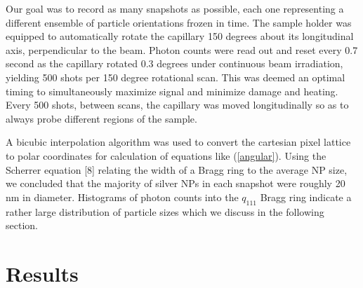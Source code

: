 \documentclass [11pt,fleqn]{article}
\begin{document}
Our goal was to record as many snapshots as possible, each one representing a different ensemble of particle orientations frozen in time. The sample holder was equipped to automatically rotate the capillary 150 degrees about its longitudinal axis, perpendicular to the beam. Photon counts were read out and reset every 0.7 second as the capillary rotated 0.3 degrees under continuous beam irradiation, yielding 500 shots per 150 degree rotational scan. This was deemed an optimal timing to simultaneously maximize signal and minimize damage and heating. Every 500 shots, between scans, the capillary was moved longitudinally so as to always probe different regions of the sample.

A bicubic interpolation algorithm was used to convert the cartesian pixel lattice to polar coordinates for calculation of equations like (\ref{angular}). Using the Scherrer equation [8] relating the width of a Bragg ring to the average NP size, we concluded that the majority of silver NPs in each snapshot were roughly 20 nm in diameter. Histograms of photon counts into the $q_{111}$ Bragg ring indicate a rather large distribution of particle sizes which we discuss in the following section.

\section{Results}
\end{document}
